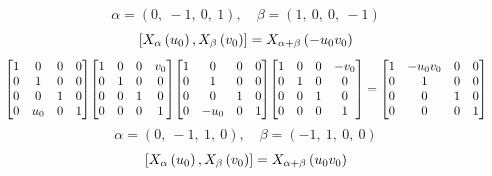 \documentclass[11pt]{article}
\theoremstyle{definition}
\begin{document}
\[
\alpha = \left( 0, \  -1, \  0, \  1\right), \quad \beta = \left( 1, \  0, \  0, \  -1\right)
\]
\[
\scaletoalign{\textwidth}{\left[ X_{\alpha}\left(u_{0}\right), X_{\beta}\left(v_{0}\right) \right] = X_{\alpha + \beta}\left(- u_{0} v_{0}\right)}
\]
\[
\scaletoalign{\textwidth}{{\left[\begin{matrix}1 & 0 & 0 & 0\\0 & 1 & 0 & 0\\0 & 0 & 1 & 0\\0 & u_{0} & 0 & 1\end{matrix}\right]} {\left[\begin{matrix}1 & 0 & 0 & v_{0}\\0 & 1 & 0 & 0\\0 & 0 & 1 & 0\\0 & 0 & 0 & 1\end{matrix}\right]} {\left[\begin{matrix}1 & 0 & 0 & 0\\0 & 1 & 0 & 0\\0 & 0 & 1 & 0\\0 & - u_{0} & 0 & 1\end{matrix}\right]} {\left[\begin{matrix}1 & 0 & 0 & - v_{0}\\0 & 1 & 0 & 0\\0 & 0 & 1 & 0\\0 & 0 & 0 & 1\end{matrix}\right]} = {\left[\begin{matrix}1 & - u_{0} v_{0} & 0 & 0\\0 & 1 & 0 & 0\\0 & 0 & 1 & 0\\0 & 0 & 0 & 1\end{matrix}\right]}}
\]
\[
\alpha = \left( 0, \  -1, \  1, \  0\right), \quad \beta = \left( -1, \  1, \  0, \  0\right)
\]
\[
\scaletoalign{\textwidth}{\left[ X_{\alpha}\left(u_{0}\right), X_{\beta}\left(v_{0}\right) \right] = X_{\alpha + \beta}\left(u_{0} v_{0}\right)}
\]
\end{document}
